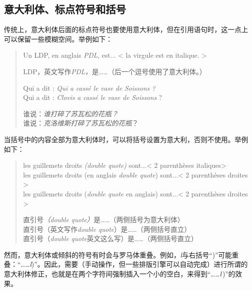 \subsection{意大利体、标点符号和括号}

传统上，意大利体后面的标点符号也要使用意大利体，但在引用语句时，这一点上可以保留一些模糊空间。举例如下：

\begin{quote}
    Un LDP, en anglais \emph{PDL,} est... < la virgule est en italique. >

    \begin{bil}
        LDP，英文写作\emph{PDL，}是……（后一个逗号使用了意大利体。）
    \end{bil}

    Qui a dit : \emph{Qui a cassé le vase de Soissons ?}\\
    Qui a dit : \emph{Clovis a cassé le vase de Soissons} ?

    \begin{bil}
        谁说：\emph{谁打碎了苏瓦松的花瓶？}\\
        谁说：\emph{克洛维斯打碎了苏瓦松的花瓶}？
    \end{bil}
\end{quote}

当括号中的内容全部为意大利体时，可以将括号设置为意大利，否则不使用。举例如下：

\begin{quote}
    les guillemets droits \emph{(double quote)} sont...< 2 parenthèses italiques>\\
    les guillemets droits (en anglais \emph{double quote}) sont...< 2 parenthèses droites >\\
    les guillemets droits (\emph{double quote} en anglais) sont...< 2 parenthèses droites >

    \begin{bil}
        直引号\emph{（double quote）}是……（两侧括号为意大利体）\\
        直引号（英文写作\emph{double quote}）是……（两侧括号直立）\\
        直引号（\emph{double quote}英文这么写）是……（两侧括号直立）
    \end{bil}
\end{quote}

然而，意大利体或倾斜的符号有时会与罗马体重叠。例如，\emph{l}与右括号``)''可能重叠：``……\emph{l}\!)''。因此，需要（手动操作，但一些排版引擎可以自动完成）进行所谓的意大利体修正，也就是在两个字符间强制插入一个小的空白，来得到``……\emph{l}\,)''的效果。